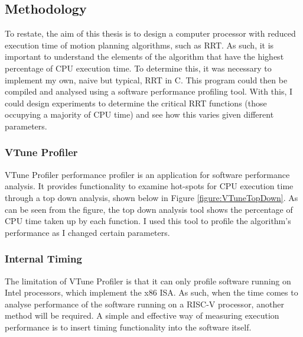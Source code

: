 

\subsection{Methodology}
    To restate, the aim of this thesis is to design a computer processor with reduced execution time of motion planning algorithms, such as \gls{RRT}. As such, it is important to understand the elements of the algorithm that have the highest percentage of CPU execution time. To determine this, it was necessary to implement my own, naive but typical, \gls{RRT} in C. This program could then be compiled and analysed using a software performance profiling tool. With this, I could design experiments to determine the critical RRT functions (those occupying a majority of CPU time) and see how this varies given different parameters.

    \subsubsection*{VTune Profiler}
    \label{subsubsection:vtune}
        VTune Profiler performance profiler is an application for software performance analysis. It provides functionality to examine hot-spots for CPU execution time through a top down analysis, shown below in Figure \ref{figure:VTuneTopDown}. As can be seen from the figure, the top down analysis tool shows the percentage of CPU time taken up by each function. I used this tool to profile the algorithm's performance as I changed certain parameters.
        

    \subsubsection*{Internal Timing}
        The limitation of VTune Profiler is that it can only profile software running on Intel processors, which implement the x86 \gls{ISA}. As such, when the time comes to analyse performance of the software running on a RISC-V processor, another method will be required. A simple and effective way of measuring execution performance is to insert timing functionality into the software itself. \\

